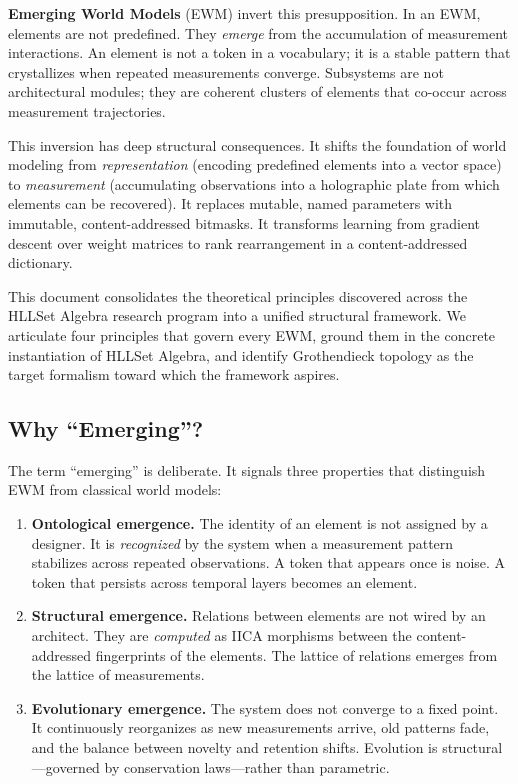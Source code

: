 \documentclass[11pt,a4paper]{article}
\theoremstyle{remark}
\begin{document}
\textbf{Emerging World Models} (EWM) invert this presupposition. In an EWM, elements are
not predefined. They \textit{emerge} from the accumulation of measurement interactions.
An element is not a token in a vocabulary; it is a stable pattern that crystallizes when
repeated measurements converge. Subsystems are not architectural modules; they are
coherent clusters of elements that co-occur across measurement trajectories.

This inversion has deep structural consequences. It shifts the foundation of world
modeling from \textit{representation} (encoding predefined elements into a vector space)
to \textit{measurement} (accumulating observations into a holographic plate from which
elements can be recovered). It replaces mutable, named parameters with immutable,
content-addressed bitmasks. It transforms learning from gradient descent over weight
matrices to rank rearrangement in a content-addressed dictionary.

This document consolidates the theoretical principles discovered across the HLLSet
Algebra research program \cite{astesj2026,sgs2024} into a unified structural framework.
We articulate four principles that govern every EWM, ground them in the concrete
instantiation of HLLSet Algebra, and identify Grothendieck topology as the target
formalism toward which the framework aspires.

\subsection{Why ``Emerging''?}

The term ``emerging'' is deliberate. It signals three properties that distinguish EWM
from classical world models:

\begin{enumerate}[leftmargin=*,nosep]
  \item \textbf{Ontological emergence.} The identity of an element is not assigned by a
    designer. It is \textit{recognized} by the system when a measurement pattern
    stabilizes across repeated observations. A token that appears once is noise. A token
    that persists across temporal layers becomes an element.
  \item \textbf{Structural emergence.} Relations between elements are not wired by an
    architect. They are \textit{computed} as IICA morphisms between the content-addressed
    fingerprints of the elements. The lattice of relations emerges from the lattice of
    measurements.
  \item \textbf{Evolutionary emergence.} The system does not converge to a fixed point.
    It continuously reorganizes as new measurements arrive, old patterns fade, and the
    balance between novelty and retention shifts. Evolution is structural---governed by
    conservation laws---rather than parametric.
\end{enumerate}
\end{document}
